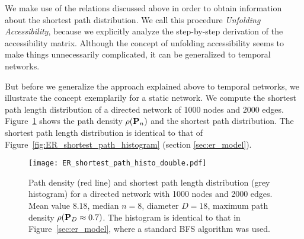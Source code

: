 We make use of the relations discussed above in order to obtain information about the shortest path distribution.
We call this procedure \emph{Unfolding Accessibility}, because we explicitly analyze the step-by-step derivation of the accessibility matrix.
Although the concept of unfolding accessibility seems to make things unnecessarily complicated, it can be generalized to temporal networks.

But before we generalize the approach explained above to temporal networks, we illustrate the concept exemplarily for a static \ER network.
We compute the shortest path length distribution of a directed \ER network of 1000 nodes and 2000 edges.
Figure~\ref{fig:er_histo} shows the path density $\rho (\mathbf{P}_n)$ and the shortest path distribution.
The shortest path length distribution is identical to that of Figure~\ref{fig:ER_shortest_path_histogram} (section \ref{sec:er_model}).
%
\begin{figure}[htbp]
\begin{center}
\texttt{[image: ER\_shortest\_path\_histo\_double.pdf]}
\caption{Path density (red line) and shortest path length distribution (grey histogram) for a directed \ER network with 1000 nodes and 2000 edges.
Mean value $8.18$, median $n=8$, diameter $D=18$, maximum path density $\rho (\mathbf{P}_D\approx 0.7)$.
The histogram is identical to that in Figure~\ref{sec:er_model}, where a standard BFS algorithm was used.
}
\label{fig:er_histo}
\end{center}
\end{figure}
%


